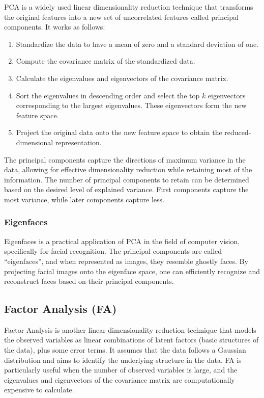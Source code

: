 PCA is a widely used linear dimensionality reduction technique that transforms the original features into a new set of uncorrelated features called principal components. It works as follows:
\begin{enumerate}
    \item Standardize the data to have a mean of zero and a standard deviation of one.
    \item Compute the covariance matrix of the standardized data.
    \item Calculate the eigenvalues and eigenvectors of the covariance matrix.
    \item Sort the eigenvalues in descending order and select the top $k$ eigenvectors corresponding to the largest eigenvalues. These eigenvectors form the new feature space.
    \item Project the original data onto the new feature space to obtain the reduced-dimensional representation.
\end{enumerate}

The principal components capture the directions of maximum variance in the data, allowing for effective dimensionality reduction while retaining most of the information. The number of principal components to retain can be determined based on the desired level of explained variance. First components capture the most variance, while later components capture less.

\subsubsection{Eigenfaces}

Eigenfaces is a practical application of PCA in the field of computer vision, specifically for facial recognition. The principal components are called ``eigenfaces'', and when represented as images, they resemble ghostly faces. By projecting facial images onto the eigenface space, one can efficiently recognize and reconstruct faces based on their principal components.

\subsection{Factor Analysis (FA)}

Factor Analysis is another linear dimensionality reduction technique that models the observed variables as linear combinations of latent factors (basic structures of the data), plus some error terms. It assumes that the data follows a Gaussian distribution and aims to identify the underlying structure in the data. FA is particularly useful when the number of observed variables is large, and the eigenvalues and eigenvectors of the covariance matrix are computationally expensive to calculate.

